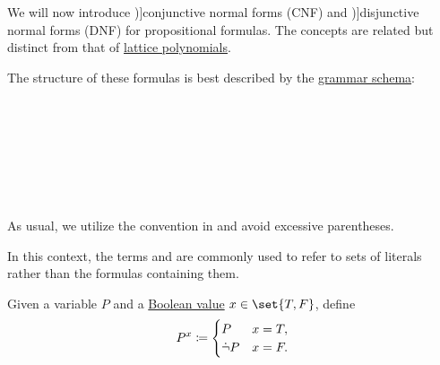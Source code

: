 \begin{definition}\label{def:cnf_and_dnf}
  We will now introduce \term[ru=конъюнктивная нормальная форма, en=conjunctive normal form (\cite[sec. 2.3.2]{Savage1998})]{conjunctive normal forms} (CNF) and \term[ru=дизъюнктивная нормальная форма, en=disjunctive normal form (\cite[sec. 2.3.1]{Savage1998})]{disjunctive normal forms} (DNF) for propositional formulas. The concepts are related but distinct from that of \hyperref[rem:lattice_polynomials]{lattice polynomials}.

  \begin{thmenum}
     The structure of these formulas is best described by the \hyperref[rem:backus_normal_form]{grammar schema}:
    \begin{bnf*}
           {} \\
           {\synneg {}} \\
                    { \bnfor {}} \\
                   { \bnfor \bnftsq{(} \bnfsp {}  \bnfsp \bnftsq{\( \synvee \)}   \bnfsp {} \bnfsp \bnftsq{)}} \\
                        {     \bnfor \bnftsq{(} \bnfsp {} \bnfsp \bnftsq{\( \synwedge \)} \bnfsp {}      \bnfsp \bnftsq{)}} \\
                   { \bnfor \bnftsq{(} \bnfsp {}  \bnfsp \bnftsq{\( \synwedge \)} \bnfsp {} \bnfsp \bnftsq{)}} \\
                        {     \bnfor \bnftsq{(} \bnfsp {} \bnfsp \bnftsq{\( \synvee \)}   \bnfsp {}      \bnfsp \bnftsq{)}}
    \end{bnf*}

    As usual, we utilize the convention in  and avoid excessive parentheses.

    In this context, the terms  and  are commonly used to refer to sets of literals rather than the formulas containing them.

     Given a variable \( P \) and a \hyperref[def:boolean_value]{Boolean value} \( x \in \set{ T, F } \), define
    \begin{equation*}
      P^x \coloneqq \begin{cases}
        P      &x = T, \\
        \dot\neg P &x = F.
      \end{cases}
    \end{equation*}


\end{thmenum}
\end{definition}

